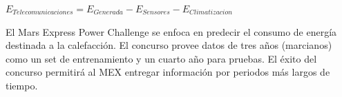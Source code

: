\documentclass[../Main.tex]{subfiles}
\begin{document}
\begin{center}
$E_{Telecomunicaciones} = E_{Generada} - E_{Sensores} - E_{Climatizacion}$
\end{center}

El Mars Express Power Challenge se enfoca en predecir el consumo de energía destinada a la calefacción. El concurso provee datos de tres años (marcianos) como un set de entrenamiento y un cuarto año para pruebas. El éxito del concurso permitirá al MEX entregar información por periodos más largos de tiempo.






\end{document}
